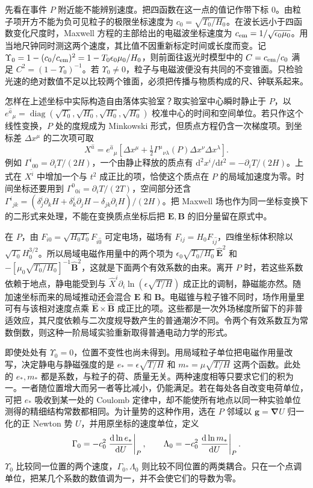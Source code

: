 先看在事件 $P$ 附近能不能辨别速度。把四函数在这一点的值记作带下标 $0$。由粒子项开方不能为负可见粒子的极限坐标速度为 $c_0=\sqrt{T_0/H_0}$。在波长远小于四函数变化尺度时，Maxwell 方程的主部给出的电磁波坐标速度为 $c_{\rm em}=1/\sqrt{\epsilon_0\mu_0}$。用当地尺钟同时测这两个速度，其比值不因重新标定时间或长度而变。记 $\Upsilon_0=1-(c_0/c_{\rm em})^2=1-T_0\epsilon_0\mu_0/H_0$，则前面往返光时模型中的 $C=c_{\rm em}/c_0$ 满足 $C^2=(1-\Upsilon_0)^{-1}$。若 $\Upsilon_0\ne0$，粒子与电磁波便没有共同的不变锥面。只检验光速的绝对数值不足以比较两个锥面，必须把传播与物质构成的尺、钟联系起来。

怎样在上述坐标中实际构造自由落体实验室？取实验室中心瞬时静止于 $P$，以 $e^{\hat a}{}_{\mu}=\operatorname{diag}(\sqrt{T_0},\sqrt{H_0},\sqrt{H_0},\sqrt{H_0})$ 校准中心的时间和空间单位。若只作这个线性变换，$P$ 处的度规成为 Minkowski 形式，但质点方程仍含一次梯度项。到坐标差 $\Delta x^\mu$ 的二次项可取
\[
 X^{\hat a}=e^{\hat a}{}_{\mu}
 \left[\Delta x^\mu+\tfrac12\Gamma^\mu{}_{\nu\lambda}(P)
                          \Delta x^\nu\Delta x^\lambda\right].
\]
例如 $\Gamma^i{}_{00}=\partial_iT/(2H)$，一个由静止释放的质点有 $\mathrm d^2x^i/\mathrm dt^2=-\partial_iT/(2H)$。上式在 $X^{\hat i}$ 中增加一个与 $t^2$ 成正比的项，恰使这个质点在 $P$ 的局域加速度为零。时间坐标还要用到 $\Gamma^0{}_{0i}=\partial_iT/(2T)$，空间部分还含 $\Gamma^i{}_{jk}=(\delta^i_j\partial_kH+\delta^i_k\partial_jH-\delta_{jk}\partial_iH)/(2H)$。把 Maxwell 场也作为同一坐标变换下的二形式来处理，不能在变换质点坐标后把 $\bm E,\bm B$ 的旧分量留在原式中。

在 $P$，由 $F_{i0}=\sqrt{H_0T_0}F_{\hat i\hat0}$ 可定电场，磁场有 $F_{ij}=H_0F_{\hat i\hat j}$，四维坐标体积除以 $\sqrt{T_0}H_0^{3/2}$。所以局域电磁作用量中的两个项为 $\epsilon_0\sqrt{T_0/H_0}\,\hat{\bm E}^2$ 和 $-[\mu_0\sqrt{T_0/H_0}]^{-1}\hat{\bm B}^2$，这就是下面两个有效系数的由来。离开 $P$ 时，若这些系数依赖于地点，静电能受到与 $\hat X^i\partial_i\ln(\epsilon\sqrt{T/H})$ 成正比的调制，静磁能亦然。随加速坐标而来的局域推动还会混合 $\bm E$ 和 $\bm B$。电磁锥与粒子锥不同时，场作用量里可有与该相对速度点乘 $\hat{\bm E}\times\hat{\bm B}$ 成正比的项。这些都是一次外场梯度所留下的非普适效应，其尺度依赖与二次度规导数产生的普通潮汐不同。令两个有效系数互为常数倒数，则这种一阶局域实验重新取得普通电动力学的形式。

即使处处有 $\Upsilon_0=0$，位置不变性也尚未得到。用局域粒子单位把电磁作用量改写，决定静电与静磁强度的是 $e_*=\epsilon\sqrt{T/H}$ 和 $m_*=\mu\sqrt{T/H}$ 这两个函数。此处的 $e_*,m_*$ 都是系数，与粒子的荷、质量无关。两种速度相等只要求它们的积为一。一者随位置增大而另一者等比减小，仍能满足。若在每处各自改变电荷单位，可把 $e_*$ 吸收到某一处的 Coulomb 定律中，却不能使所有地点以同一种实验单位测得的精细结构常数都相同。为计量势的这种作用，选在 $P$ 邻域以 $\bm g=\bm\nabla U$ 归一化的正 Newton 势 $U$，并用原坐标的速度单位，定义
\[
    \Gamma_0=-c_0^2\left.\frac{\dd\ln e_*}{\dd U}\right|_P,\qquad
    \Lambda_0=-c_0^2\left.\frac{\dd\ln m_*}{\dd U}\right|_P .
\]
$\Upsilon_0$ 比较同一位置的两个速度，$\Gamma_0,\Lambda_0$ 则比较不同位置的两类耦合。只在一个点调单位，把某几个系数的数值调为一，并不会使它们的导数为零。

